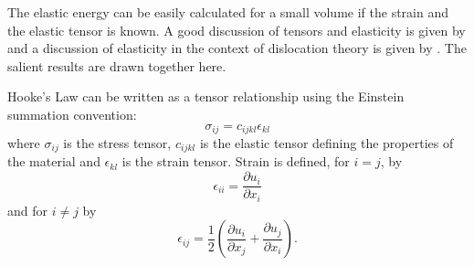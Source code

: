 The elastic energy can be easily calculated for a small volume if the strain and the elastic tensor is known. A good discussion of tensors and elasticity is given by \citet{kelly_knowles2012chapter5_tensors,kelly_knowles2012chapter6_stress_strain} and a discussion of elasticity in the context of dislocation theory is given by \citet{hirth_lothe1982elasticity}. The salient results are drawn together here.

Hooke's Law can be written as a tensor relationship using the Einstein summation convention:
\begin{equation}
\sigma_{ij} = c_{ijkl} \epsilon_{kl}
\end{equation}
where $\sigma_{ij}$ is the stress tensor, $c_{ijkl}$ is the elastic tensor defining the properties of the material and $\epsilon_{kl}$ is the strain tensor. Strain is defined, for $i=j$, by
\begin{equation}
\epsilon_{ii} = \frac{\partial u_i}{\partial x_i}
\end{equation}
and for $i\neq j$ by
\begin{equation}
\epsilon_{ij} = \frac{1}{2} \left( \frac{\partial u_i}{\partial x_j} + \frac{\partial u_j}{\partial x_i} \right).
\end{equation}
